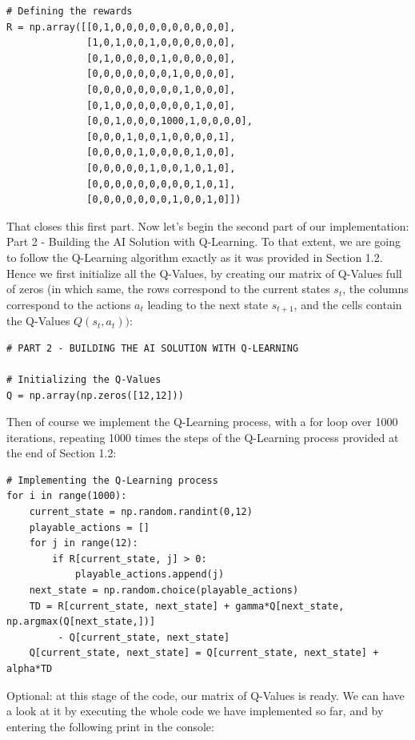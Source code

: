 \documentclass[]{book}
\begin{document}
\begin{lstlisting}
# Defining the rewards
R = np.array([[0,1,0,0,0,0,0,0,0,0,0,0],
              [1,0,1,0,0,1,0,0,0,0,0,0],
              [0,1,0,0,0,0,1,0,0,0,0,0],
              [0,0,0,0,0,0,0,1,0,0,0,0],
              [0,0,0,0,0,0,0,0,1,0,0,0],
              [0,1,0,0,0,0,0,0,0,1,0,0],
              [0,0,1,0,0,0,1000,1,0,0,0,0],
              [0,0,0,1,0,0,1,0,0,0,0,1],
              [0,0,0,0,1,0,0,0,0,1,0,0],
              [0,0,0,0,0,1,0,0,1,0,1,0],
              [0,0,0,0,0,0,0,0,0,1,0,1],
              [0,0,0,0,0,0,0,1,0,0,1,0]])
\end{lstlisting}

That closes this first part. Now let's begin the second part of our implementation: Part 2 - Building the AI Solution with Q-Learning. To that extent, we are going to follow the Q-Learning algorithm exactly as it was provided in Section 1.2. Hence we first initialize all the Q-Values, by creating our matrix of Q-Values full of zeros (in which same, the rows correspond to the current states \(s_t\), the columns correspond to the actions \(a_t\) leading to the next state \(s_{t+1}\), and the cells contain the Q-Values \(Q(s_t,a_t))\):

\begin{lstlisting}
# PART 2 - BUILDING THE AI SOLUTION WITH Q-LEARNING

# Initializing the Q-Values
Q = np.array(np.zeros([12,12]))
\end{lstlisting}

Then of course we implement the Q-Learning process, with a for loop over 1000 iterations, repeating 1000 times the steps of the Q-Learning process provided at the end of Section 1.2:

\begin{lstlisting}
# Implementing the Q-Learning process
for i in range(1000):
    current_state = np.random.randint(0,12)
    playable_actions = []
    for j in range(12):
        if R[current_state, j] > 0:
            playable_actions.append(j)
    next_state = np.random.choice(playable_actions)
    TD = R[current_state, next_state] + gamma*Q[next_state, np.argmax(Q[next_state,])]
         - Q[current_state, next_state]
    Q[current_state, next_state] = Q[current_state, next_state] + alpha*TD
\end{lstlisting}

Optional: at this stage of the code, our matrix of Q-Values is ready. We can have a look at it by executing the whole code we have implemented so far, and by entering the following print in the console:
\end{document}
